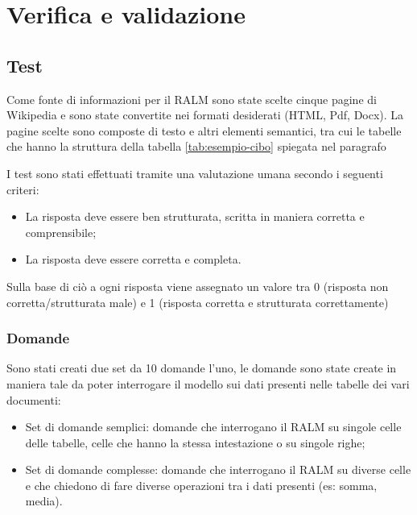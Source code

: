 \chapter{Verifica e validazione}
\label{cap:verifica-validazione}


\section{Test}
Come fonte di informazioni per il RALM sono state scelte cinque pagine di Wikipedia e sono state convertite nei formati desiderati (HTML, Pdf, Docx).
La pagine scelte sono composte di testo e altri elementi semantici, tra cui le tabelle che hanno la struttura della tabella \ref{tab:esempio-cibo} spiegata nel paragrafo 

I test sono stati effettuati tramite una valutazione umana secondo i seguenti criteri:
\begin{itemize}
    \item La risposta deve essere ben strutturata, scritta in maniera corretta e comprensibile;
    \item La risposta deve essere corretta e completa.
\end{itemize}

Sulla base di ciò a ogni risposta viene assegnato un valore tra 0 (risposta non corretta/strutturata male) e 1 (risposta corretta e strutturata correttamente)

\subsection{Domande}
Sono stati creati due set da 10 domande l'uno, le domande sono state create in maniera tale da poter interrogare il modello sui dati presenti nelle tabelle dei vari documenti:
\begin{itemize}
    \item Set di domande semplici: domande che interrogano il RALM su singole celle delle tabelle, celle che hanno la stessa intestazione o su singole righe;
    \item Set di domande complesse: domande che interrogano il RALM su diverse celle e che chiedono di fare diverse operazioni tra i dati presenti (es: somma, media).
\end{itemize}


